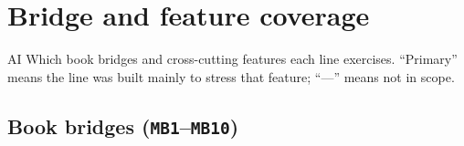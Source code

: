 \authbarneedspace
\section{Bridge and feature coverage}
\label{sec:appn-bridge-coverage}
\begin{authbar}{AI}
Which book bridges and cross-cutting features each line exercises. ``Primary'' means the line was built mainly to stress that feature; ``---'' means not in scope.

\end{authbar}
\authbarsubneedspace
\subsection{Book bridges (\texttt{MB1}--\texttt{MB10})}
\label{sec:appn-bridge-mb}

